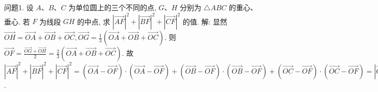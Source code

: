 
问题1. 设 $A 、 B 、 C$ 为单位圆上的三个不同的点, $G 、 H$ 分别为 $\triangle A B C$ 的重心、垂心.
若 $F$ 为线段 $G H$ 的中点, 求 $|\overrightarrow{A F}|^2+|\overrightarrow{B F}|^2+|\overrightarrow{C F}|^2$ 的值.
解:
显然 $\overrightarrow{O H}=\overrightarrow{O A}+\overrightarrow{O B}+\overrightarrow{O C}, \overrightarrow{O G}=\frac{1}{3}(\overrightarrow{O A}+\overrightarrow{O B}+\overrightarrow{O C})$.
则 $\overrightarrow{O F}=\frac{\overrightarrow{O G}+\overrightarrow{O H}}{2}=\frac{2}{3}(\overrightarrow{O A}+\overrightarrow{O B}+\overrightarrow{O C})$.
故 $|\overrightarrow{A F}|^2+|\overrightarrow{B F}|^2+|\overrightarrow{C F}|^2=(\overrightarrow{O A}-\overrightarrow{O F}) \cdot(\overrightarrow{O A}-\overrightarrow{O F})+(\overrightarrow{O B}- \overrightarrow{O F}) \cdot(\overrightarrow{O B}-\overrightarrow{O F})+(\overrightarrow{O C}-\overrightarrow{O F}) \cdot(\overrightarrow{O C}-\overrightarrow{O F})=|\overrightarrow{O A}|^2+|\overrightarrow{O B}|^2+ |\overrightarrow{O C}|^2-2(\overrightarrow{O A}+\overrightarrow{O B}+\overrightarrow{O C}) \cdot \overrightarrow{O F}+3 \overrightarrow{O F} \cdot \overrightarrow{O F}=|\overrightarrow{O A}|^2+|\overrightarrow{O B}|^2+ |\overrightarrow{O C}|^2-[2(\overrightarrow{O A}+\overrightarrow{O B}+\overrightarrow{O C})-3 \overrightarrow{O F}] \cdot \overrightarrow{O F}=|\overrightarrow{O A}|^2+|\overrightarrow{O B}|^2+|\overrightarrow{O C}|^2=3$.



